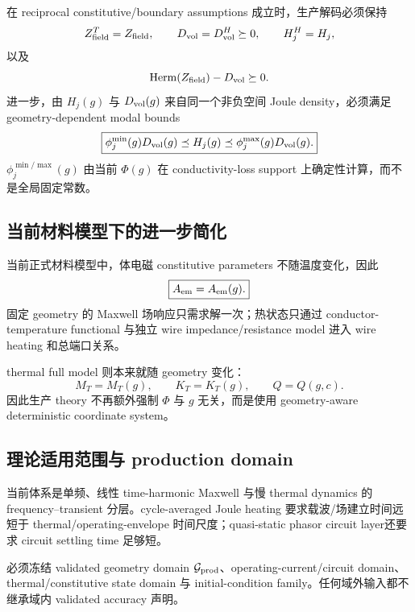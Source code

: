 在 reciprocal constitutive/boundary assumptions 成立时，生产解码必须保持
\begin{equation}
Z_{\rm field}^T=Z_{\rm field},\qquad
D_{\rm vol}=D_{\rm vol}^H\succeq0,\qquad
H_j^H=H_j,
\end{equation}
以及
\begin{equation}
\operatorname{Herm}(Z_{\rm field})-D_{\rm vol}\succeq0.
\end{equation}
进一步，由 $H_j(g)$ 与 $D_{\rm vol}(g)$ 来自同一个非负空间 Joule density，必须满足 geometry-dependent modal bounds
\begin{equation}
\boxed{
\phi_j^{\min}(g)D_{\rm vol}(g)
\preceq H_j(g)
\preceq\phi_j^{\max}(g)D_{\rm vol}(g).
}
\end{equation}
$\phi_j^{\min/\max}(g)$ 由当前 $\Phi(g)$ 在 conductivity-loss support 上确定性计算，而不是全局固定常数。

\subsection{当前材料模型下的进一步简化}
当前正式材料模型中，体电磁 constitutive parameters 不随温度变化，因此
\begin{equation}
\boxed{A_{\rm em}=A_{\rm em}(g).}
\end{equation}
固定 geometry 的 Maxwell 场响应只需求解一次；热状态只通过 conductor-temperature functional 与独立 wire impedance/resistance model 进入 wire heating 和总端口关系。

thermal full model 则本来就随 geometry 变化：
\begin{equation}
M_T=M_T(g),\qquad K_T=K_T(g),\qquad Q=Q(g,c).
\end{equation}
因此生产 theory 不再额外强制 $\Phi$ 与 $g$ 无关，而是使用 geometry-aware deterministic coordinate system。

\subsection{理论适用范围与 production domain}
当前体系是单频、线性 time-harmonic Maxwell 与慢 thermal dynamics 的 frequency--transient 分层。cycle-averaged Joule heating 要求载波/场建立时间远短于 thermal/operating-envelope 时间尺度；quasi-static phasor circuit layer还要求 circuit settling time 足够短。

必须冻结 validated geometry domain $\mathcal G_{\rm prod}$、operating-current/circuit domain、thermal/constitutive state domain 与 initial-condition family。任何域外输入都不继承域内 validated accuracy 声明。


